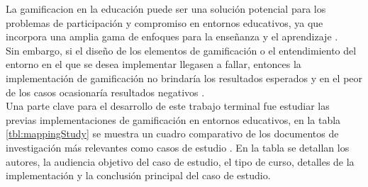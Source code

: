  La \gls{gamificacion} en la educación puede ser una solución potencial para los
 problemas de participación y compromiso en entornos educativos, ya que incorpora
 una amplia gama de enfoques para la enseñanza y el aprendizaje \cite{Aldemir}.\\

 \noindent Sin embargo, si el diseño de los elementos de gamificación o el
 entendimiento del entorno en el que se desea implementar llegasen a fallar,
 entonces la implementación de gamificación no brindaría los resultados esperados
 y en el peor de los casos ocasionaría resultados negativos
 \cite[p. 1109]{GamInE-Learning}.\\

 \noindent Una parte clave para el desarrollo de este trabajo terminal fue estudiar
 las previas implementaciones de gamificación en entornos educativos, en la tabla
 \ref{tbl:mappingStudy} se muestra un cuadro comparativo de los documentos de
 investigación más relevantes como casos de estudio \cite{mappingStudy}. En la tabla
 se detallan los autores, la audiencia objetivo del caso de estudio, el tipo de
 curso, detalles de la implementación y la conclusión principal del caso de estudio.\\

